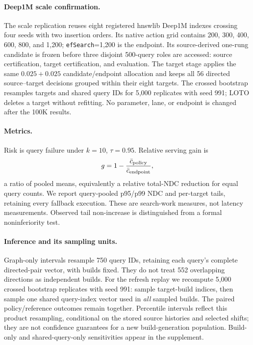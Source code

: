 \paragraph{Deep1M scale confirmation.}
The scale replication reuses eight registered hnswlib Deep1M indexes crossing four seeds with two insertion orders. Its native action grid contains 200, 300, 400, 600, 800, and 1,200; \texttt{efSearch}=1,200 is the endpoint. Its source-derived one-rung candidate is frozen before three disjoint 500-query roles are accessed: source certification, target certification, and evaluation. The target stage applies the same $0.025+0.025$ candidate/endpoint allocation and keeps all 56 directed source--target decisions grouped within their eight targets. The crossed bootstrap resamples targets and shared query IDs for 5,000 replicates with seed 991; LOTO deletes a target without refitting. No parameter, lane, or endpoint is changed after the 100K results.

\paragraph{Metrics.}
Risk is query failure under $k=10$, $\tau=0.95$. Relative serving gain is
\begin{equation}
 g=1-\frac{\bar c_{\rm policy}}{\bar c_{\rm endpoint}},\label{eq:gain}
\end{equation}
a ratio of pooled means, equivalently a relative total-NDC reduction for equal query counts. We report query-pooled p95/p99 NDC and per-target tails, retaining every fallback execution. These are search-work measures, not latency measurements. Observed tail non-increase is distinguished from a formal noninferiority test.

\paragraph{Inference and its sampling units.}
Graph-only intervals resample 750 query IDs, retaining each query's complete directed-pair vector, with builds fixed. They do not treat 552 overlapping directions as independent builds. For the refresh replay we recompute 5,000 crossed bootstrap replicates with seed 991: sample target-build indices, then sample one shared query-index vector used in \emph{all} sampled builds. The paired policy/reference outcomes remain together. Percentile intervals reflect this product resampling, conditional on the stored source histories and selected shifts; they are not confidence guarantees for a new build-generation population. Build-only and shared-query-only sensitivities appear in the supplement.

